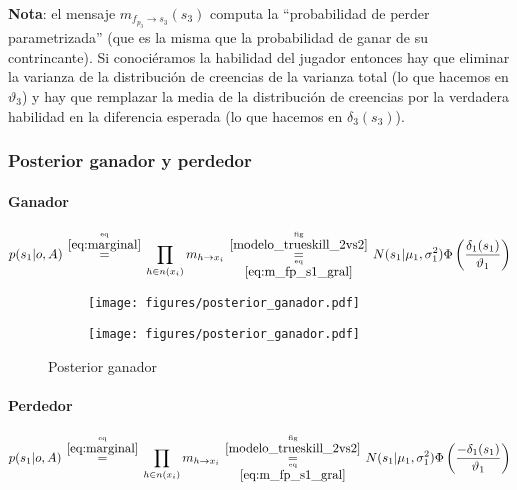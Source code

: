 \documentclass[article]{jss}
\newcommand\hfrac[2]{\genfrac{}{}{0pt}{}{#1}{#2}} %
\begin{document}
\textbf{Nota}: el mensaje $m_{f_{p_3} \rightarrow s_3}(s_3)$ computa la ``probabilidad de perder parametrizada'' (que es la misma que la probabilidad de ganar de su contrincante). Si conoci\'eramos la habilidad del jugador entonces hay que eliminar la varianza de la distribuci\'on de creencias de la varianza total (lo que hacemos en $\vartheta_3$) y hay que remplazar la media de la distribuci\'on de creencias por la verdadera habilidad en la diferencia esperada (lo que hacemos en $\delta_3(s_3)$).

\subsubsection{Posterior ganador y perdedor}
\paragraph{Ganador}
\begin{equation}\label{eq:posterior_ganador}
 p(s_1|o,A) \overset{\hfrac{\text{eq}}{\ref{eq:marginal}}}{=} \prod_{h \in n(x_i)} m_{h \rightarrow x_i} \overset{\hfrac{\text{fig}}{\ref{modelo_trueskill_2vs2}}}{\underset{\hfrac{\text{eq}}{\ref{eq:m_fp_s1_gral}}}{=}}  N(s_1| \mu_1, \sigma_1^2)  \Phi\left(\frac{\delta_1(s_1)}{\vartheta_1}\right)
\end{equation}


\begin{figure}[t!]
\centering
  \begin{subfigure}[t]{0.48\textwidth}
  \texttt{[image: figures/posterior\_ganador.pdf]}
  \caption{}
  \label{posterior_ganador_image}
  \end{subfigure}
  \begin{subfigure}[t]{0.48\textwidth}
  \texttt{[image: figures/posterior\_ganador.pdf]}
  \caption{}
  \label{posterior_ganador_distribution}
  \end{subfigure}
  \caption{Posterior ganador}
  \label{posterior_ganador}
\end{figure}

\paragraph{Perdedor}

\begin{equation}\label{eq:posterior_perdedor}
 p(s_1|o,A) \overset{\hfrac{\text{eq}}{\ref{eq:marginal}}}{=} \prod_{h \in n(x_i)} m_{h \rightarrow x_i} \overset{\hfrac{\text{fig}}{\ref{modelo_trueskill_2vs2}}}{\underset{\hfrac{\text{eq}}{\ref{eq:m_fp_s1_gral}}}{=}}  N(s_1| \mu_1, \sigma_1^2)  \Phi\left(\frac{-\delta_1(s_1)}{\vartheta_1}\right)
\end{equation}
\end{document}
